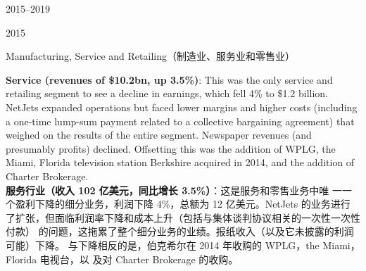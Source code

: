 \begin{chapter}{2015--2019}
\begin{section}{2015}
\begin{subsection}{Manufacturing, Service and Retailing（制造业、服务业和零售业）}
\begin{verseparallel}
  {
    \textbf{Service (revenues of \$10.2bn, up 3.5\%)}: This was the only service
    and retailing segment to see a decline in earnings, which fell 4\% to \$1.2
    billion. NetJets expanded operations but faced lower margins and higher
    costs (including a one-time lump-sum payment related to a collective
    bargaining agreement) that weighed on the results of the entire segment.
    Newspaper revenues (and presumably profits) declined. Offsetting this was
    the addition of WPLG, the Miami, Florida television station Berkshire
    acquired in 2014, and the addition of Charter Brokerage. \\
  }
  {
    \textbf{服务行业（收入 102 亿美元，同比增长 3.5\%）}：这是服务和零售业务中唯
    一一个盈利下降的细分业务，利润下降 4\%，总额为 12 亿美元。NetJets 的业务进行
    了扩张，但面临利润率下降和成本上升（包括与集体谈判协议相关的一次性一次性付款）
    的问题，这拖累了整个细分业务的业绩。报纸收入（以及它未披露的利润可能）下降。
    与下降相反的是，伯克希尔在 2014 年收购的 WPLG，the Miami，Florida 电视台，以
    及对 Charter Brokerage 的收购。
  }
\end{verseparallel}

\begin{verseparallel}
  {

}
\end{verseparallel}
\end{subsection}
\end{section}
\end{chapter}
